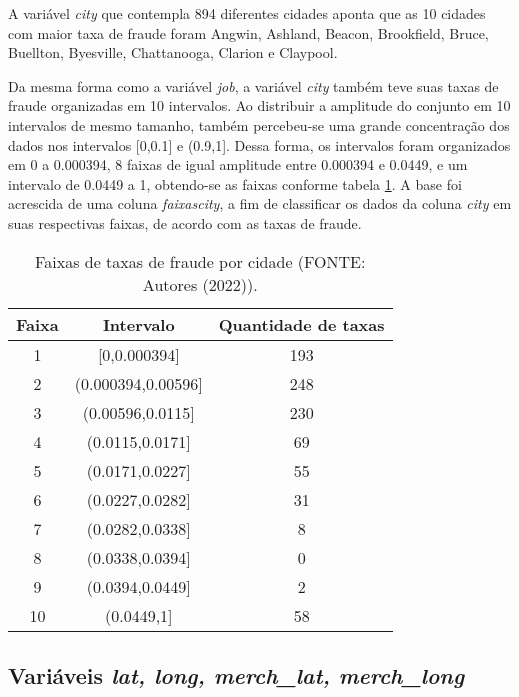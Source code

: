 \documentclass{article}
\begin{document}
A variável \textit{city} que contempla 894 diferentes cidades aponta que as 10 cidades com maior taxa de fraude foram Angwin, Ashland, Beacon, Brookfield, Bruce, Buellton, Byesville, Chattanooga, Clarion e Claypool. 

Da mesma forma como a variável \textit{job}, a variável \textit{city} também teve suas taxas de fraude organizadas em 10 intervalos. Ao distribuir a amplitude do conjunto em 10 intervalos de mesmo tamanho, também percebeu-se uma grande concentração dos dados nos intervalos [0,0.1] e (0.9,1]. Dessa forma, os intervalos foram organizados em 0 a 0.000394, 8 faixas de igual amplitude entre 0.000394 e 0.0449, e um intervalo de 0.0449 a 1, obtendo-se as faixas conforme tabela \ref{tab-city}. A base foi acrescida de uma coluna \textit{faixascity}, a fim de classificar os dados da coluna \textit{city} em suas respectivas faixas, de acordo com as taxas de fraude.

\begin{table}[!ht]
\centering
\begin{tabular}{ccc}
Faixa & Intervalo             & Quantidade de taxas \\ \hline
1     & {[}0,0.000394{]}      & 193                  \\
2     & ({0.000394,0.00596]}  & 248                 \\
3     & ({0.00596,0.0115]}    & 230                  \\
4     & ({0.0115,0.0171]}     & 69                 \\
5     & ({0.0171,0.0227]}     & 55                 \\
6     & ({0.0227,0.0282]}     & 31                 \\
7     & ({0.0282,0.0338]}     & 8                \\
8     & ({0.0338,0.0394]}     & 0               \\
9     & ({0.0394,0.0449]}     & 2                \\
10    & ({0.0449,1]}          & 58                
\end{tabular}
\caption{Faixas de taxas de fraude por cidade (FONTE: Autores (2022)).}
\label{tab-city}
\end{table}


\subsection{Variáveis \textit{lat, long, merch\_lat, merch\_long}}
\end{document}
